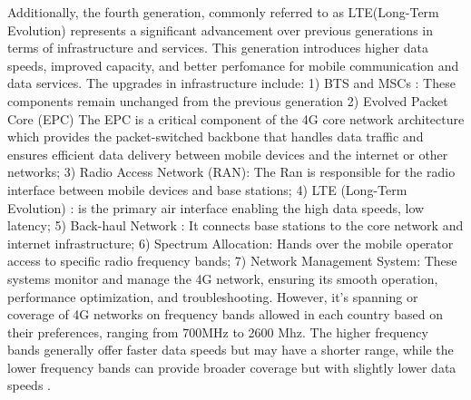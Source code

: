 \documentclass[12pt,a4paper]{report}
\begin{document}
	   Additionally, the fourth generation, commonly referred to as LTE(Long-Term Evolution) represents a significant advancement over previous generations in terms of infrastructure and services. This generation introduces higher data speeds, improved capacity, and better perfomance for mobile communication and data services. The upgrades in infrastructure include: 1) BTS and MSCs : These components remain unchanged from the previous generation 2) Evolved Packet Core (EPC)  The EPC is a critical component of the 4G core network architecture which provides the packet-switched backbone that handles data traffic and ensures efficient data delivery between mobile devices and the internet or other networks; 3)  Radio Access Network (RAN): The Ran is responsible for the radio interface between mobile devices and base stations; 4) LTE (Long-Term Evolution) :  is the primary air interface enabling the high data speeds, low latency; 5) Back-haul Network : It connects base stations to the core network and internet infrastructure; 6) Spectrum Allocation: Hands over the mobile operator access to specific radio frequency bands; 7) Network Management System: These systems monitor and manage the 4G network, ensuring its smooth operation, performance optimization, and troubleshooting.
	   However, it's spanning or coverage of 4G networks on frequency bands allowed in each country based on their preferences, ranging from 700MHz to 2600 Mhz. The higher frequency bands generally offer faster data speeds but may have a shorter range, while the lower frequency bands can provide broader coverage but with slightly lower data speeds \cite{mishra2007advanced}.
\end{document}
